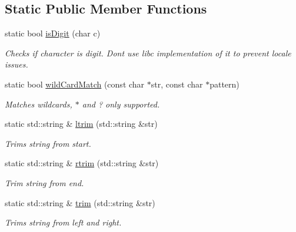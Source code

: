 \subsection*{Static Public Member Functions}
\begin{DoxyCompactItemize}
\item 
\mbox{\label{classel_1_1base_1_1utils_1_1_str_a4caae91dfe0310d9f182bd9b7e99103c}} 
static bool \hyperlink{classel_1_1base_1_1utils_1_1_str_a4caae91dfe0310d9f182bd9b7e99103c}{is\+Digit} (char c)
\begin{DoxyCompactList}\small\item\em Checks if character is digit. Dont use libc implementation of it to prevent locale issues. \end{DoxyCompactList}\item 
\mbox{\label{classel_1_1base_1_1utils_1_1_str_a95e007a25dfcbd77d4c573b0f73b3153}} 
static bool \hyperlink{classel_1_1base_1_1utils_1_1_str_a95e007a25dfcbd77d4c573b0f73b3153}{wild\+Card\+Match} (const char $\ast$str, const char $\ast$pattern)
\begin{DoxyCompactList}\small\item\em Matches wildcards, \textquotesingle{}$\ast$\textquotesingle{} and \textquotesingle{}?\textquotesingle{} only supported. \end{DoxyCompactList}\item 
static std\+::string \& \hyperlink{classel_1_1base_1_1utils_1_1_str_a64b7a841f04ed916ed8d234b8508703e}{ltrim} (std\+::string \&str)
\begin{DoxyCompactList}\small\item\em Trims string from start. \end{DoxyCompactList}\item 
static std\+::string \& \hyperlink{classel_1_1base_1_1utils_1_1_str_a9202797763e10861c4fa84ffd40198bb}{rtrim} (std\+::string \&str)
\begin{DoxyCompactList}\small\item\em Trim string from end. \end{DoxyCompactList}\item 
static std\+::string \& \hyperlink{classel_1_1base_1_1utils_1_1_str_aba0bc132c410fd3c1e128d1038e996ba}{trim} (std\+::string \&str)
\begin{DoxyCompactList}\small\item\em Trims string from left and right. \end{DoxyCompactList}\item 

\end{DoxyCompactItemize}
